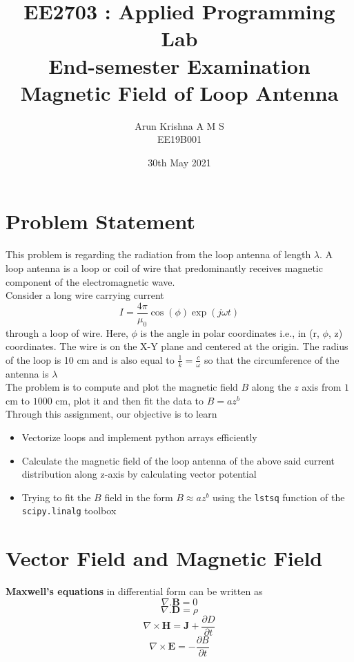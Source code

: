 \documentclass[12pt, a4paper]{report}
\title{\textbf{EE2703 : Applied Programming Lab \\ End-semester Examination \\ Magnetic Field of Loop Antenna}} %
\author{Arun Krishna A M S \\ EE19B001} %
\date{30th May 2021} %
\begin{document}
		
		
\maketitle %
\justifying

\section*{Problem Statement}
This problem is regarding the radiation from the loop antenna of length $\lambda$. A loop antenna is a loop or coil of wire that predominantly receives magnetic component of the electromagnetic wave.
\\

Consider a long wire carrying current
\begin{equation*}
I = \frac{4\pi}{\mu_0}\cos({\phi})\exp({j\omega t})
\end{equation*}
through a loop of wire. Here, $\phi$ is the angle in polar coordinates i.e., in (r, $\phi$, z) coordinates. The wire is on the X-Y plane and centered at the origin. The radius of the loop is 10 cm and is also equal to $\frac{1}{k} = \frac{c}{\omega}$ so that the circumference of the antenna is $\lambda$
\\

The problem is to compute and plot the magnetic field $B$ along the $z$ axis from $1$ cm to
$1000$ cm, plot it and then fit the data to $B = az^b$
\\

Through this assignment, our objective is to learn 
\begin{itemize}
  	\item Vectorize loops and implement python arrays efficiently
    \item Calculate the magnetic field of the loop antenna of the above said current distribution along z-axis by calculating vector potential 
  	\item Trying to fit the $B$ field in the form $B \approx az^b$ using the \texttt{lstsq} function of the \texttt{scipy.linalg} toolbox
\end{itemize}

\section*{Vector Field and Magnetic Field}
\textbf{Maxwell's equations} in differential form can be written as
\begin{equation*}
\nabla. \mathbf{B} = 0
\end{equation*}
\begin{equation*}
\nabla. \mathbf{D} = \rho
\end{equation*}
\begin{equation}
\nabla \times \mathbf{H} = \mathbf{J} + \frac{\partial D}{\partial t}
\end{equation}
\begin{equation}
\nabla \times \mathbf{E} = - \frac{\partial B}{\partial t}
\end{equation}
\end{document}
